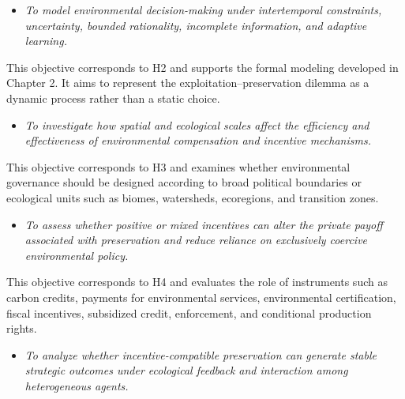 \begin{itemize}

    \item[\textbf{G2.}]
    
    \textit{To model environmental decision-making under intertemporal constraints, uncertainty, bounded rationality, incomplete information, and adaptive learning.}

\end{itemize}

This objective corresponds to H2 and supports the formal modeling developed in Chapter 2. It aims to represent the exploitation--preservation dilemma as a dynamic process rather than a static choice.

\begin{itemize}

    \item[\textbf{G3.}]
    
    \textit{To investigate how spatial and ecological scales affect the efficiency and effectiveness of environmental compensation and incentive mechanisms.}

\end{itemize}

This objective corresponds to H3 and examines whether environmental governance should be designed according to broad political boundaries or ecological units such as biomes, watersheds, ecoregions, and transition zones.

\begin{itemize}

    \item[\textbf{G4.}]
    
    \textit{To assess whether positive or mixed incentives can alter the private payoff associated with preservation and reduce reliance on exclusively coercive environmental policy.}

\end{itemize}

This objective corresponds to H4 and evaluates the role of instruments such as carbon credits, payments for environmental services, environmental certification, fiscal incentives, subsidized credit, enforcement, and conditional production rights.

\begin{itemize}

    \item[\textbf{G5.}]
    
    \textit{To analyze whether incentive-compatible preservation can generate stable strategic outcomes under ecological feedback and interaction among heterogeneous agents.}

\end{itemize}

